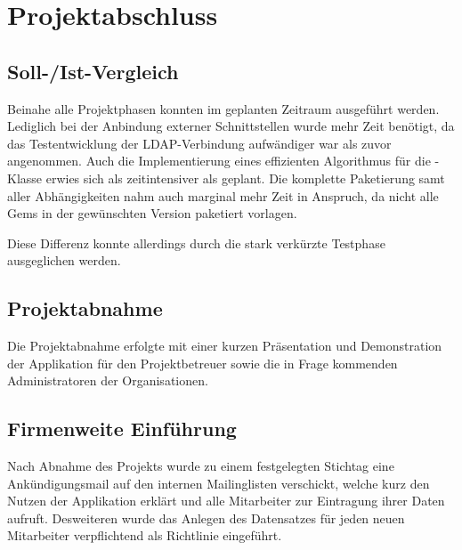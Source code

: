 \section{Projektabschluss}
\label{sec:Projektabschluss}

\subsection{Soll-/Ist-Vergleich}
\label{sec:SollIstVergleich}
Beinahe alle Projektphasen konnten im geplanten Zeitraum ausgeführt werden. Lediglich bei
der Anbindung externer Schnittstellen wurde mehr Zeit benötigt, da das Testentwicklung der
\acs{LDAP}-Verbindung aufwändiger war als zuvor angenommen. Auch die Implementierung eines
effizienten Algorithmus für die -Klasse erwies sich als zeitintensiver als geplant.
Die komplette Paketierung samt aller Abhängigkeiten nahm auch marginal mehr Zeit in Anspruch, da
nicht alle Gems in der gewünschten Version paketiert vorlagen.

Diese Differenz konnte allerdings durch die stark verkürzte Testphase ausgeglichen werden.


\subsection{Projektabnahme}
\label{sec:Projektabnahme}
Die Projektabnahme erfolgte mit einer kurzen Präsentation und Demonstration der Applikation für den
Projektbetreuer sowie die in Frage kommenden Administratoren der Organisationen.

\subsection{Firmenweite Einführung}
\label{Firmenweite Einführung}
Nach Abnahme des Projekts wurde zu einem festgelegten Stichtag eine Ankündigungsmail auf den
internen Mailinglisten verschickt, welche kurz den Nutzen der Applikation erklärt und alle
Mitarbeiter zur Eintragung ihrer Daten aufruft. Desweiteren wurde das Anlegen des Datensatzes für
jeden neuen Mitarbeiter verpflichtend als Richtlinie eingeführt.
